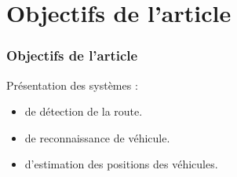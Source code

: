 \section{Objectifs de l'article}
\begin{frame}
\frametitle{Objectifs de l'article}
Présentation des systèmes :
\begin{itemize}
\item de détection de la route.
\item de reconnaissance de véhicule.
\item d'estimation des positions des véhicules.
\end{itemize}
\end{frame}
